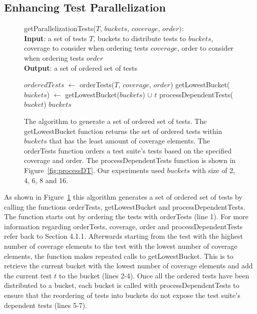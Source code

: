 \subsection{Enhancing Test Parallelization}
\begin{figure}[t]
	getParallelizationTests($\mathit{T}$, $\mathit{buckets}$, $\mathit{coverage}$,
	$\mathit{order}):$\\
	\textbf{Input}: a set of tests $\mathit{T}$, buckets to distribute tests to
	$\mathit{buckets}$, coverage to consider when ordering tests 
	$\mathit{coverage}$, order to consider when ordering tests $\mathit{order}$\\
	\textbf{Output}: a set of ordered set of tests\\
	 \begin{algorithmic}[1]
	 	\vspace{-5mm}
		\STATE $\mathit{orderedTests}$ $\leftarrow$ orderTests($\mathit{T}$,
		$\mathit{coverage}$, $\mathit{order}$)
			\STATE getLowestBucket($\mathit{buckets}$) $\leftarrow$
			getLowestBucket($\mathit{buckets}$) $\cup$ $\mathit{t}$
		\ENDFOR
			\STATE processDependentTests($\mathit{bucket}$)
		\ENDFOR
		\RETURN $\mathit{buckets}$
	\end{algorithmic}
	\vspace{-3mm}
	\caption {
		The algorithm to generate a set of ordered set of tests. The getLowestBucket
		function returns the set of ordered tests within $\mathit{buckets}$ that has
		the least amount of coverage elements. The orderTests function orders a test
		suite's tests based on the specified coverage and order. The
		processDependentTests function is shown in Figure~\ref{fig:processDT}. Our
		experiments used $\mathit{buckets}$ with size of 2, 4, 6, 8 and 16.
	}
	\label{fig:parallelization}
\end{figure}

As shown in Figure~\ref{fig:parallelization} this algorithm generates a set of
ordered set of tests by calling the functions orderTests, getLowestBucket and
processDependentTests. The function starts out by ordering the tests with
orderTests (line 1). For more information regarding orderTests, coverage, order
and processDependentTests refer back to Section 4.1.1. Afterwards starting from
the test with the highest number of coverage elements to the test with the
lowest number of coverage elements, the function makes repeated calls to
getLowestBucket. This is to retrieve the current bucket with the lowest number
of coverage elements and add the current test $\mathit{t}$ to the bucket (lines
2-4). Once all the ordered tests have been distributed to a bucket, each bucket
is called with processDependentTests to ensure that the reordering of tests
into buckets do not expose the test suite's dependent tests (lines 5-7).
